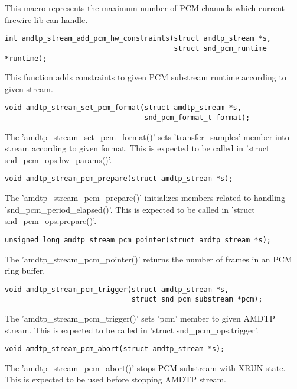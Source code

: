 \documentclass[onecolumn]{jarticle}
\begin{document}
This macro represents the maximum number of PCM channels which current firewire-lib can handle.

\begin{verbatim}
int amdtp_stream_add_pcm_hw_constraints(struct amdtp_stream *s,
                                        struct snd_pcm_runtime *runtime);
\end{verbatim}

This function adds constraints to given PCM substream runtime according to given stream.

\begin{verbatim}
void amdtp_stream_set_pcm_format(struct amdtp_stream *s,
                                 snd_pcm_format_t format);
\end{verbatim}

The 'amdtp\_stream\_set\_pcm\_format()' sets 'transfer\_samples' member into stream according to given format. This is expected to be called in 'struct snd\_pcm\_ops.hw\_params()'.

\begin{verbatim}
void amdtp_stream_pcm_prepare(struct amdtp_stream *s);
\end{verbatim}

The 'amdtp\_stream\_pcm\_prepare()' initializes members related to handling 'snd\_pcm\_period\_elapsed()'. This is expected to be called in 'struct snd\_pcm\_ops.prepare()'.

\begin{verbatim}
unsigned long amdtp_stream_pcm_pointer(struct amdtp_stream *s);
\end{verbatim}

The 'amdtp\_stream\_pcm\_pointer()' returns the number of frames in an PCM ring buffer.

\begin{verbatim}
void amdtp_stream_pcm_trigger(struct amdtp_stream *s,
                              struct snd_pcm_substream *pcm);
\end{verbatim}

The 'amdtp\_stream\_pcm\_trigger()' sets 'pcm' member to given AMDTP stream. This is expected to be called in 'struct snd\_pcm\_ops.trigger'.

\begin{verbatim}
void amdtp_stream_pcm_abort(struct amdtp_stream *s);
\end{verbatim}

The 'amdtp\_stream\_pcm\_abort()' stops PCM substream with XRUN state. This is expected to be used before stopping AMDTP stream.
\end{document}

